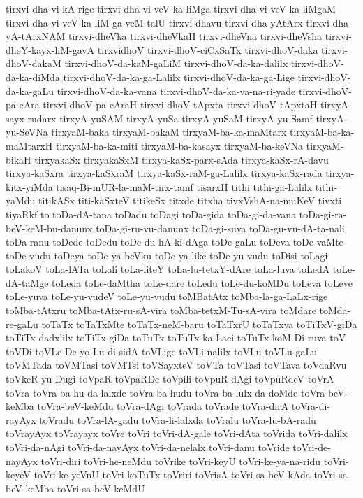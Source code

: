 {tirxvi-dha-vi-kA-rige
tirxvi-dha-vi-veV-ka-liMga
tirxvi-dha-vi-veV-ka-liMgaM
tirxvi-dha-vi-veV-ka-liM-ga-veM-talU
tirxvi-dhavu
tirxvi-dha-yAtArx
tirxvi-dha-yA-tArxNAM
tirxvi-dheVka
tirxvi-dheVkaH
tirxvi-dheVna
tirxvi-dheVsha
tirxvi-dheY-kayx-liM-gavA
tirxvidhoV
tirxvi-dhoV-ciCxSaTx
tirxvi-dhoV-daka
tirxvi-dhoV-dakaM
tirxvi-dhoV-da-kaM-gaLiM
tirxvi-dhoV-da-ka-dalilx
tirxvi-dhoV-da-ka-diMda
tirxvi-dhoV-da-ka-ga-Lalilx
tirxvi-dhoV-da-ka-ga-Lige
tirxvi-dhoV-da-ka-gaLu
tirxvi-dhoV-da-ka-vana
tirxvi-dhoV-da-ka-va-na-ri-yade
tirxvi-dhoV-pa-cAra
tirxvi-dhoV-pa-cAraH
tirxvi-dhoV-tApxta
tirxvi-dhoV-tApxtaH
tirxyA-sayx-rudarx
tirxyA-yuSAM
tirxyA-yuSa
tirxyA-yuSaM
tirxyA-yu-Samf
tirxyA-yu-SeVNa
tirxyaM-baka
tirxyaM-bakaM
tirxyaM-ba-ka-maMtarx
tirxyaM-ba-ka-maMtarxH
tirxyaM-ba-ka-miti
tirxyaM-ba-kasayx
tirxyaM-ba-keVNa
tirxyaM-bikaH
tirxyakaSx
tirxyakaSxM
tirxya-kaSx-parx-sAda
tirxya-kaSx-rA-davu
tirxya-kaSxra
tirxya-kaSxraM
tirxya-kaSx-raM-ga-Lalilx
tirxya-kaSx-rada
tirxya-kitx-yiMda
tisaq-Bi-mUR-la-maM-tirx-tamf
tisarxH
tithi
tithi-ga-Lalilx
tithi-yaMdu
titikASx
titi-kaSxteV
titikeSx
titxde
titxha
tivxVshA-na-muKeV
tivxti
tiyaRkf
to
toDa-dA-tana
toDadu
toDagi
toDa-gida
toDa-gi-da-vana
toDa-gi-ra-beV-keM-bu-danunx
toDa-gi-ru-vu-danunx
toDa-gi-suva
toDa-gu-vu-dA-ta-nali
toDa-ranu
toDede
toDedu
toDe-du-hA-ki-dAga
toDe-gaLu
toDeva
toDe-vaMte
toDe-vudu
toDeya
toDe-ya-beVku
toDe-ya-like
toDe-yu-vudu
toDisi
toLagi
toLakoV
toLa-lATa
toLali
toLa-liteY
toLa-lu-tetxY-dAre
toLa-luva
toLedA
toLe-dA-taMge
toLeda
toLe-daMtha
toLe-dare
toLedu
toLe-du-koMDu
toLeva
toLeve
toLe-yuva
toLe-yu-vudeV
toLe-yu-vudu
toMBatAtx
toMba-la-ga-LaLx-rige
toMba-tAtxru
toMba-tAtx-ru-sA-vira
toMba-tetxM-Tu-sA-vira
toMdare
toMda-re-gaLu
toTaTx
toTaTxMte
toTaTx-neM-baru
toTaTxrU
toTaTxva
toTiTxV-giDa
toTiTx-dadxlilx
toTiTx-giDa
toTuTx
toTuTx-ka-Laci
toTuTx-koM-Di-ruva
toV
toVDi
toVLe-De-yo-Lu-di-sidA
toVLige
toVLi-nalilx
toVLu
toVLu-gaLu
toVMTada
toVMTasi
toVMTsi
toVSayxteV
toVTa
toVTasi
toVTava
toVdaRvu
toVkeR-yu-Dugi
toVpaR
toVpaRDe
toVpili
toVpuR-dAgi
toVpuRdeV
toVrA
toVra
toVra-ba-hu-da-lalxde
toVra-ba-hudu
toVra-ba-lulx-da-doMde
toVra-beV-keMba
toVra-beV-keMdu
toVra-dAgi
toVrada
toVrade
toVra-dirA
toVra-di-rayAyx
toVradu
toVra-lA-gadu
toVra-li-lalxda
toVralu
toVra-lu-bA-radu
toVrayAyx
toVrayayx
toVre
toVri
toVri-dA-gale
toVri-dAta
toVrida
toVri-dalilx
toVri-da-nAgi
toVri-da-nayAyx
toVri-da-nelalx
toVri-danu
toVride
toVri-de-nayAyx
toVri-diri
toVri-he-neMdu
toVrike
toVri-keyU
toVri-ke-ya-na-ridu
toVri-keyeV
toVri-ke-yeVnU
toVri-koTuTx
toVriri
toVrisA
toVri-sa-beV-kAda
toVri-sa-beV-keMba
toVri-sa-beV-keMdU
}
